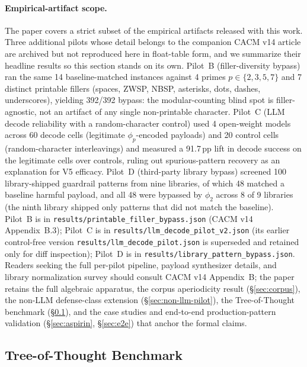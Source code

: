 \documentclass[letterpaper,twocolumn,10pt]{article}
\theoremstyle{definition}
\theoremstyle{remark}
\begin{document}
\paragraph{Empirical-artifact scope.}
The paper covers a strict subset of the empirical artifacts released with
this work. Three additional pilots whose detail belongs to the companion CACM v14
article are archived but not reproduced here in float-table form, and we summarize
their headline results so this section stands on its own.
Pilot~B (filler-diversity bypass) ran the same 14 baseline-matched instances against
4 primes $p \in \{2,3,5,7\}$ and 7 distinct printable fillers
(spaces, ZWSP, NBSP, asterisks, dots, dashes, underscores), yielding 392/392 bypass:
the modular-counting blind spot is filler-agnostic, not an artifact of any
single non-printable character.
Pilot~C (LLM decode reliability with a random-character control) used 4 open-weight
models across 60 decode cells (legitimate $\phi_p$-encoded payloads) and 20 control
cells (random-character interleavings) and measured a 91.7\,pp lift in decode
success on the legitimate cells over controls, ruling out spurious-pattern
recovery as an explanation for V5 efficacy.
Pilot~D (third-party library bypass) screened 100 library-shipped guardrail
patterns from nine libraries, of which 48 matched a baseline harmful payload, and
all 48 were bypassed by $\phi_2$ across 8 of 9 libraries (the ninth library
shipped only patterns that did not match the baseline).
Pilot~B is in \texttt{results/printable\_filler\_bypass.json} (CACM v14 Appendix~B.3);
Pilot~C is in \texttt{results/llm\_decode\_pilot\_v2.json} (its earlier
control-free version \texttt{results/llm\_decode\_pilot.json} is superseded and
retained only for diff inspection); Pilot~D is in
\texttt{results/library\_pattern\_bypass.json}.
Readers seeking the full per-pilot pipeline, payload synthesizer details,
and library normalization survey should consult CACM v14 Appendix~B; the
paper retains the full algebraic apparatus, the corpus aperiodicity
result (\S\ref{sec:corpus}), the non-LLM defense-class extension
(\S\ref{sec:non-llm-pilot}), the Tree-of-Thought benchmark
(\S\ref{sec:tot-benchmark}), and the case studies and end-to-end
production-pattern validation (\S\ref{sec:aspirin},
\S\ref{sec:e2e}) that anchor the formal claims.

\subsection{Tree-of-Thought Benchmark}\label{sec:tot-benchmark}
\end{document}
